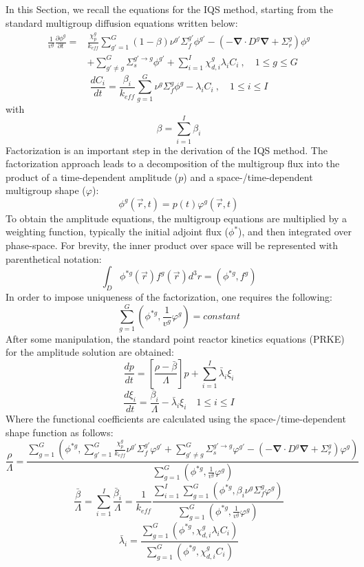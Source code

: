 \documentclass[12pt]{article}
\newcommand{\bs}[1]{\mathbf{#1}}
\renewcommand{\div}{\bs{\nabla}\! \cdot \!}
\newcommand{\grad}{\bs{\nabla}}
\newcommand{\keff}{k_\textit{eff}}
\newcommand{\be}{\begin{equation}}
\newcommand{\ee}{\end{equation}}
\begin{document}
In this Section, we recall the equations for the IQS method, starting from the standard multigroup diffusion equations written below:
\begin{align}
\frac{1}{v^g} \frac{\partial \phi^g }{\partial t} =& \frac{\chi_p^g}{\keff} \sum_{g'=1}^G (1-\beta) \nu^{g'} \Sigma_f^{g'} \phi^{g'} -  \left( -\div D^g \grad  + \Sigma_r^g \right) \phi^g  \nonumber \\
&  + \sum_{g'\neq g}^G\Sigma_s^{g'\to g} \phi^{g'}  + \sum_{i=1}^I\chi_{d,i}^g\lambda_i C_i \ , \quad 1 \le g \le G 
\end{align}
\be
\frac{dC_i}{dt} = \frac{\beta_i}{k_{eff}}\sum_{g=1}^G\nu^{g} \Sigma_f^g \phi^{g} - \lambda_i C_i \ , \quad 1 \le i \le I 
\ee
with
\be
\beta = \sum_{i=1}^I \beta_{i} 
\ee
Factorization is an important step in the derivation of the IQS method. The factorization approach leads to a decomposition of the multigroup flux into the product of a time-dependent amplitude ($p$) and a space-/time-dependent multigroup shape ($\varphi$):
\be
\phi^g(\vec{r},t)=p(t)\varphi^g(\vec{r},t)
\ee
To obtain the amplitude equations, the multigroup equations are multiplied by a weighting function, typically the initial adjoint flux ($\phi^*$), and then integrated over phase-space.  For brevity, the inner product over space will be represented with parenthetical notation:
\be
\int_D\phi^{*g}(\vec{r})f^g(\vec{r})d^3r=\left(\phi^{*g},f^g\right)
\ee
In order to impose uniqueness of the factorization, one requires the following:
\be
\sum_{g=1}^G\left(\phi^{*g},\frac{1}{v^g}\varphi^g\right) = \textit{constant}
\ee
After some manipulation, the standard point reactor kinetics equations (PRKE) for the amplitude solution are obtained:
\be
\frac{dp}{dt}=\left[\frac{\rho-\bar{\beta}}{\Lambda}\right]p+\sum_{i=1}^I\bar{\lambda}_i\xi_i
\ee
\be
\frac{d\xi_i}{dt}=\frac{\bar{\beta}_i}{\Lambda}-\bar{\lambda}_i\xi_i \quad 1 \le i \le I 
\ee
Where the functional coefficients are calculated using the space-/time-dependent shape function as follows:
\be
\frac{\rho}{\Lambda}=
\frac{ \sum_{g=1}^G \left(\phi^{*g},\sum_{g'=1}^G\frac{\chi_p^g}{\keff} \nu^{g'} \Sigma_f^{g'}\varphi^{g'} + \sum_{g'\neq g}^G\Sigma_s^{g'\to g} \varphi^{g'} -\left( -\div D^g \grad  + \Sigma_r^g \right)\varphi^g\right)}
{\sum_{g=1}^G \left(\phi^{*g},\frac{1}{v^g}\varphi^g\right)}
\ee
\be
\frac{\bar{\beta}}{\Lambda}=\sum_{i=1}^I\frac{\bar{\beta}_i}{\Lambda}=\frac{1}{\keff}
\frac{\sum_{i=1}^I\sum_{g=1}^G(\phi^{*g}, \beta_i\nu^{g} \Sigma_f^g \varphi^{g})}
{\sum_{g=1}^G \left(\phi^{*g},\frac{1}{v^g}\varphi^g\right)}
\ee
\be
\bar{\lambda}_i=\frac{\sum_{g=1}^G(\phi^{*g},\chi_{d,i}^g\lambda_i C_i)}{\sum_{g=1}^G(\phi^{*g},\chi_{d,i}^gC_i)}
\ee
\end{document}
